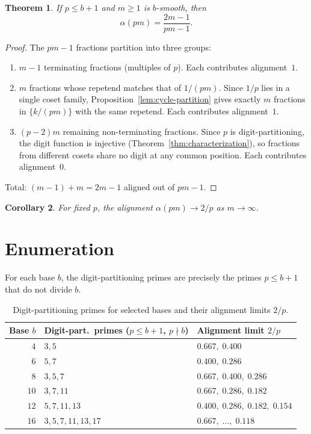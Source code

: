 \documentclass[12pt]{amsart}
\newtheorem{theorem}{Theorem}
\newtheorem{corollary}[theorem]{Corollary}
\theoremstyle{definition}
\theoremstyle{remark}
\begin{document}
\begin{theorem}\label{thm:alignment}
If $p \le b + 1$ and $m \ge 1$ is $b$-smooth, then
\[
\alpha(pm) = \frac{2m - 1}{pm - 1}.
\]
\end{theorem}

\begin{proof}
The $pm - 1$ fractions partition into three groups:

\begin{enumerate}
\item[\textup{(A)}]
$m - 1$ terminating fractions (multiples of $p$). Each contributes
alignment~$1$.

\item[\textup{(B)}]
$m$ fractions whose repetend matches that of $1/(pm)$.
Since $1/p$ lies in a single coset family,
Proposition~\ref{lem:cycle-partition} gives exactly $m$
fractions in $\{k/(pm)\}$ with the same repetend.
Each contributes alignment~$1$.

\item[\textup{(C)}]
$(p{-}2)m$ remaining non-terminating fractions.
Since $p$ is digit-partitioning, the digit function is
injective (Theorem~\ref{thm:characterization}), so
fractions from different cosets share no digit at
any common position. Each contributes alignment~$0$.
\end{enumerate}

Total: $(m{-}1) + m = 2m - 1$ aligned out of $pm - 1$.
\end{proof}

\begin{corollary}\label{cor:limit}
For fixed $p$, the alignment $\alpha(pm) \to 2/p$ as
$m \to \infty$.
\end{corollary}

\section{Enumeration}

For each base $b$, the digit-partitioning primes are precisely the
primes $p \le b + 1$ that do not divide $b$.

\begin{table}[h]
\centering
\begin{tabular}{rll}
\toprule
Base $b$ & Digit-part.\ primes ($p \le b{+}1$, $p \nmid b$) & Alignment limit $2/p$ \\
\midrule
$4$  & $3, 5$               & $0.667,\; 0.400$ \\
$6$  & $5, 7$               & $0.400,\; 0.286$ \\
$8$  & $3, 5, 7$            & $0.667,\; 0.400,\; 0.286$ \\
$10$ & $3, 7, 11$           & $0.667,\; 0.286,\; 0.182$ \\
$12$ & $5, 7, 11, 13$       & $0.400,\; 0.286,\; 0.182,\; 0.154$ \\
$16$ & $3, 5, 7, 11, 13, 17$& $0.667,\; \ldots,\; 0.118$ \\
\bottomrule
\end{tabular}
\caption{Digit-partitioning primes for selected bases and their
alignment limits $2/p$.}
\label{tab:bases}
\end{table}
\end{document}
